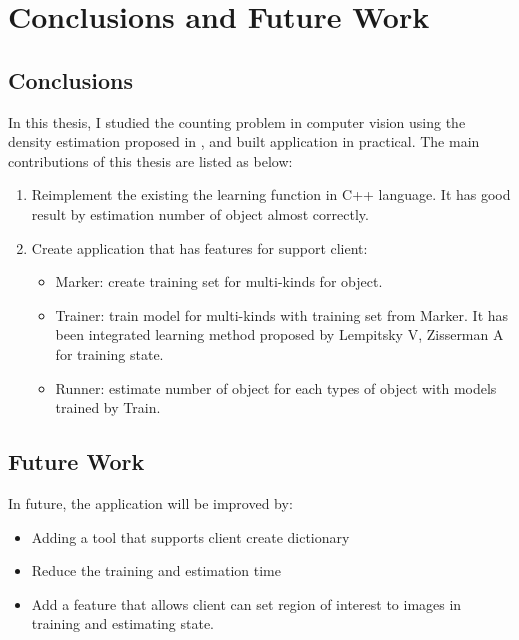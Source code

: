 \chapter{Conclusions and Future Work}

\section{Conclusions}
In this thesis, I studied the counting problem in computer vision using the density estimation proposed in \cite{Lempitsky:Zisserman:Destimate}, and built application in practical. The main contributions of this thesis are listed as below:\\
\begin{enumerate}
    \item Reimplement the existing the learning function in C++ language. It has good result by estimation number of object almost correctly.
    \item Create application that has features for support client: 
    \begin{itemize}
        \item Marker: create training set for multi-kinds for object.  
        \item Trainer: train model for multi-kinds with training set from Marker. It has been integrated learning method proposed by Lempitsky V, Zisserman A \cite{Lempitsky:Zisserman:Destimate} for training state. 
        \item Runner: estimate number of object for each types of object with models trained by Train.
    \end{itemize}
\end{enumerate}

\section{Future Work} 
In future, the application will be improved by: 
\begin{itemize}
    \item Adding a tool that supports client create dictionary
    \item Reduce the training and estimation time
    \item Add a feature that allows client can set region of interest to images in training and estimating state.
\end{itemize}